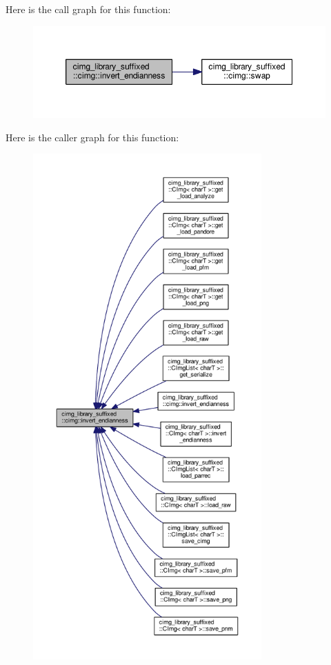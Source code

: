 Here is the call graph for this function\+:
\nopagebreak
\begin{figure}[H]
\begin{center}
\leavevmode
\includegraphics[width=350pt]{d4/d9b/namespacecimg__library__suffixed_1_1cimg_a1f8e231e39844ce1685d2fa80edd852d_cgraph}
\end{center}
\end{figure}
Here is the caller graph for this function\+:
\nopagebreak
\begin{figure}[H]
\begin{center}
\leavevmode
\includegraphics[height=550pt]{d4/d9b/namespacecimg__library__suffixed_1_1cimg_a1f8e231e39844ce1685d2fa80edd852d_icgraph}
\end{center}
\end{figure}
